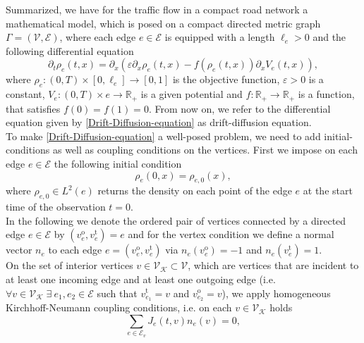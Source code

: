 Summarized, we have for the traffic flow in a compact road network a mathematical model, which is posed on a compact directed metric graph $\Gamma = (\mathcal{V}, \mathcal{E})$, where each edge $e \in \mathcal{E}$ is equipped with a length $\ell_e > 0$ and the following differential equation
\begin{equation} 
    \label{Drift-Diffusion-equation}
    \partial_t \rho_e (t,x) = \partial_x (\varepsilon \partial_x \rho_e (t,x) - f(\rho_e (t,x) ) \partial_x V_e (t,x)),
\end{equation}
where $\rho_e \colon (0, T) \times [0, \ell_e] \to [0, 1]$ is the objective function, $\varepsilon > 0$ is a constant, $V_e \colon (0,T) \times e \to \mathbb{R}_{+}$ is a given potential and $f \colon \mathbb{R}_{+} \to \mathbb{R}_{+}$ is a function, that satisfies $f(0) = f(1) = 0$. From now on, we refer to the differential equation given by \cref{Drift-Diffusion-equation} as drift-diffusion equation. \\
To make \cref{Drift-Diffusion-equation} a well-posed problem, we need to add initial-conditions as well as coupling conditions on the vertices. First we impose on each edge $e \in \mathcal{E}$ the following initial condition
\begin{equation}
    \label{eq:initial_conditions}
    \rho_e(0,x) = \rho_{e, 0}(x),
\end{equation}
where $\rho_{e, 0} \in L^2(e)$ returns the density on each point of the edge $e$ at the start time of the observation $t=0$. \\ 
In the following we denote the ordered pair of vertices connected by a directed edge $e \in \mathcal{E}$ by $(v^{\operatorname{o}}_e, v^{\operatorname{t}}_e) = e$ and for the vertex condition we define a normal vector $n_e$ to each edge $e = (v^{\operatorname{o}}_e, v^{\operatorname{t}}_e)$ via $n_e(v^{\operatorname{o}}_e) = -1$ and $n_e(v^{\operatorname{t}}_e) = 1$. \\
On the set of interior vertices $v \in \mathcal{V}_\mathcal{K} \subset \mathcal{V}$, which are vertices that are incident to at least one incoming edge and at least one outgoing edge (i.e. $\forall v \in \mathcal{V}_\mathcal{K} \; \exists \ e_1, e_2 \in \mathcal{E}$ such that $v^{\operatorname{t}}_{e_1} = v$ and $v^{\operatorname{o}}_{e_2} = v$), we apply homogeneous Kirchhoff-Neumann coupling conditions, i.e. on each $v \in \mathcal{V}_\mathcal{K}$ holds
\begin{equation}
    \label{eq:Kirchhoff_Neumann_condition}
    \sum_{e\in \mathcal{E}_v} J_e(t,v) n_e (v)=0,
\end{equation}
